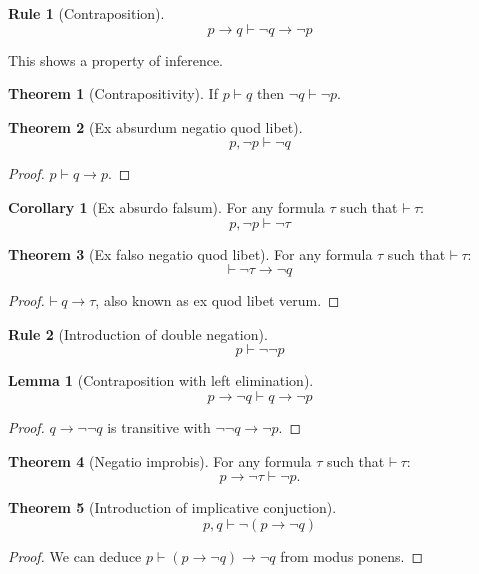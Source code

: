 \documentclass{amsbook}
\newcommand{\infers}{\mathrel\vdash}
\newcommand{\theorem}{\mathord\vdash\medspace}
\newcommand{\then}{\mathrel\rightarrow}
\theoremstyle{definition}
\newtheorem{frule}{Rule}[chapter]
\newtheorem{thm}{Theorem}[section]
\newtheorem{lmm}{Lemma}[section]
\newtheorem{crl}{Corollary}[section]
\begin{document}
\begin{frule}[Contraposition]
    $$p \then q \infers \neg q \then \neg p$$
\end{frule}

This shows a property of inference.

\begin{thm}[Contrapositivity]
    If $p \infers q$ then $\neg q \infers \neg p$.
\end{thm}

\begin{thm}[Ex absurdum negatio quod libet]
    $$p, \neg p \infers \neg q$$
    \begin{proof}
        $p \infers q \then p$.
    \end{proof}
\end{thm}

\begin{crl}[Ex absurdo falsum]
    For any formula $\tau$ such that $\theorem \tau$:
    $$p, \neg p \infers \neg\tau$$
\end{crl}

\begin{thm}[Ex falso negatio quod libet]
    For any formula $\tau$ such that $\theorem \tau$:
    $$\theorem \neg\tau \then \neg q$$
    \begin{proof}
        $\theorem q \then \tau$, also known as ex quod libet verum.
    \end{proof}
\end{thm}

\begin{frule}[Introduction of double negation]
    $$p \infers \neg\neg p$$
\end{frule}

\begin{lmm}[Contraposition with left elimination]
    $$p \then \neg q \infers q \then \neg p$$
    \begin{proof}
        $q \then \neg\neg q$ is transitive with $\neg\neg q \then \neg p$.
    \end{proof}
\end{lmm}

\begin{thm}[Negatio improbis]
    For any formula $\tau$ such that $\theorem \tau$:
    $$p \then \neg \tau \infers \neg p.$$
\end{thm}

\begin{thm}[Introduction of implicative conjuction]
    $$p, q \infers \neg(p \then \neg q)$$
    \begin{proof}
        We can deduce $p \infers (p \then \neg q) \then \neg q$ from modus ponens.
    \end{proof}
\end{thm}
\end{document}
